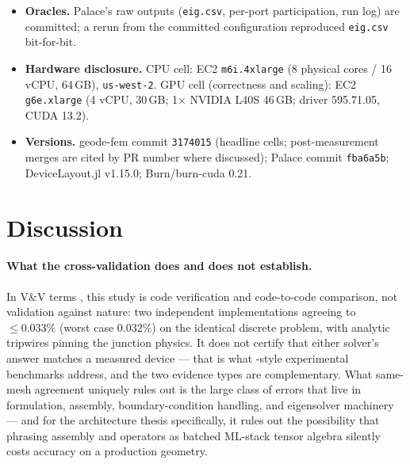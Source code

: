\documentclass{anvil-paper}
\begin{document}
\begin{itemize}
    measured L-doubling tripwire values ($17.4901 \to 12.37$\,GHz, ratio
    $0.7071$), the spurious-mode measurements ($3.4528$\,GHz,
    $p = 0.9942$; L-doubling $3.4528 \to 2.4449$\,GHz, ratio $0.7081$),
    and the full gauge/projection arc of
    Section~\ref{sec:spurious-mode} --- tree--cotree counts and the
    $1.64\%$ shift, the bulk-projection cavity/junction measurements
    (divergence ratio $50.2$; projected norm $1.06\times10^{-4}$), and
    the port-aware acceptance (all six modes, worst case $0.029\%$) ---
    are committed in , each
    pinned by a release-tier regression test.
  \item \textbf{Oracles.} Palace's raw outputs (\texttt{eig.csv},
    per-port participation, run log) are committed; a rerun from the
    committed configuration reproduced \texttt{eig.csv} bit-for-bit.
  \item \textbf{Hardware disclosure.} CPU cell: EC2 \texttt{m6i.4xlarge}
    (8 physical cores / 16 vCPU, 64\,GB), \texttt{us-west-2}. GPU cell
    (correctness and scaling): EC2 \texttt{g6e.xlarge} (4 vCPU, 30\,GB;
    1$\times$ NVIDIA L40S 46\,GB; driver 595.71.05, CUDA 13.2).
  \item \textbf{Versions.} geode-fem commit \texttt{3174015} (headline
    cells; post-measurement merges are cited by PR number where
    discussed); Palace commit \texttt{fba6a5b}; DeviceLayout.jl v1.15.0;
    Burn/burn-cuda 0.21.
\end{itemize}

\section{Discussion}
\label{sec:discussion}

\paragraph{What the cross-validation does and does not establish.}
In V\&V terms \citep{roache1997quantification,oberkampf2010verification},
this study is code verification and code-to-code comparison, not
validation against nature: two independent implementations agreeing to
$\leq 0.033\%$ (worst case $0.032\%$) on the identical discrete problem,
with analytic tripwires pinning the junction physics. It does not certify
that either solver's answer matches a measured device --- that is what
\citet{ye2025electromagnetic}-style experimental benchmarks address, and
the two evidence types are complementary. What same-mesh agreement
uniquely rules out is the large class of errors that live in formulation,
assembly, boundary-condition handling, and eigensolver machinery --- and
for the architecture thesis specifically, it rules out the possibility
that phrasing assembly and operators as batched ML-stack tensor algebra
silently costs accuracy on a production geometry.
\end{document}
